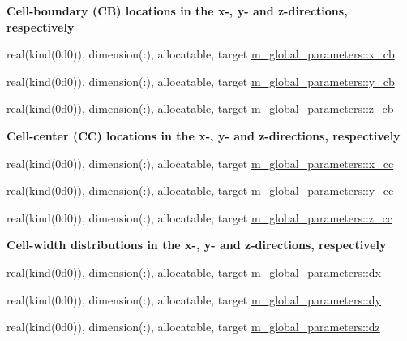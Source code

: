\begin{Indent}\textbf{ Cell-\/boundary (CB) locations in the x-\/, y-\/ and z-\/directions, respectively}\par
\begin{DoxyCompactItemize}
\item 
real(kind(0d0)), dimension(\+:), allocatable, target \hyperlink{namespacem__global__parameters_a800c19cad11fe2774ac137b12ec89e33}{m\+\_\+global\+\_\+parameters\+::x\+\_\+cb}
\item 
real(kind(0d0)), dimension(\+:), allocatable, target \hyperlink{namespacem__global__parameters_a4bb8b661a170fc6ccd9fa3cc4b32c960}{m\+\_\+global\+\_\+parameters\+::y\+\_\+cb}
\item 
real(kind(0d0)), dimension(\+:), allocatable, target \hyperlink{namespacem__global__parameters_aa75fcd53fdc4fb58ca0fbc2cc9678673}{m\+\_\+global\+\_\+parameters\+::z\+\_\+cb}
\end{DoxyCompactItemize}
\end{Indent}
\begin{Indent}\textbf{ Cell-\/center (CC) locations in the x-\/, y-\/ and z-\/directions, respectively}\par
\begin{DoxyCompactItemize}
\item 
real(kind(0d0)), dimension(\+:), allocatable, target \hyperlink{namespacem__global__parameters_aea5b911d65b330f65e97052e9e8c0383}{m\+\_\+global\+\_\+parameters\+::x\+\_\+cc}
\item 
real(kind(0d0)), dimension(\+:), allocatable, target \hyperlink{namespacem__global__parameters_aaa584e01b4153d246d84eef286482632}{m\+\_\+global\+\_\+parameters\+::y\+\_\+cc}
\item 
real(kind(0d0)), dimension(\+:), allocatable, target \hyperlink{namespacem__global__parameters_a9fef803dde37fd067fd4b2215df851b9}{m\+\_\+global\+\_\+parameters\+::z\+\_\+cc}
\end{DoxyCompactItemize}
\end{Indent}
\begin{Indent}\textbf{ Cell-\/width distributions in the x-\/, y-\/ and z-\/directions, respectively}\par
\begin{DoxyCompactItemize}
\item 
real(kind(0d0)), dimension(\+:), allocatable, target \hyperlink{namespacem__global__parameters_af7508eba0a53c9a35913a502d58dfb54}{m\+\_\+global\+\_\+parameters\+::dx}
\item 
real(kind(0d0)), dimension(\+:), allocatable, target \hyperlink{namespacem__global__parameters_adc2bc27e809a773b7f5a6a65edac3b89}{m\+\_\+global\+\_\+parameters\+::dy}
\item 
real(kind(0d0)), dimension(\+:), allocatable, target \hyperlink{namespacem__global__parameters_a04878814b8097100a179152ba853262a}{m\+\_\+global\+\_\+parameters\+::dz}
\end{DoxyCompactItemize}
\end{Indent}
